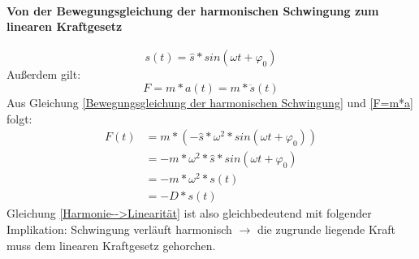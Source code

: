 	\paragraph{Von der Bewegungsgleichung der harmonischen Schwingung zum linearen Kraftgesetz}
	\begin{equation}\label{Bewegungsgleichung der harmonischen Schwingung}
		s(t)=\hat{s}*sin(\omega t+\varphi_{0})
	\end{equation}
	Außerdem gilt:
	\begin{equation}\label{F=m*a}
		F=m*a(t)=m*\ddot{s}(t)
	\end{equation}
	Aus Gleichung \ref{Bewegungsgleichung der harmonischen Schwingung} und \ref{F=m*a} folgt:
	\begin{subequations}
		\begin{align}\label{Harmonie-->Linearität}
			F(t) &=m*(-\hat{s}*\omega^{2}*sin(\omega t+\varphi_{0}))\\
			&= -m*\omega^{2}*\hat{s}*sin(\omega t+\varphi_{0})\\
			&= -m*\omega^{2}*s(t)\\
			&= -D*s(t)
		\end{align}
	\end{subequations}
	Gleichung \ref{Harmonie-->Linearität} ist also gleichbedeutend mit folgender Implikation:\newline
	Schwingung verläuft harmonisch $\rightarrow$ die zugrunde liegende Kraft muss dem linearen Kraftgesetz gehorchen.
